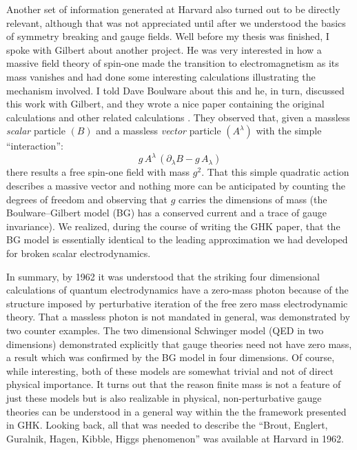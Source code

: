 \documentclass[12pt]{article}
\newcommand{\pa}{\partial}
\begin{document}
Another set of information generated at Harvard also turned out to be
directly relevant, although that was not appreciated until after we
understood the basics of symmetry breaking and gauge fields. Well
before my thesis was finished, I spoke with Gilbert about another
project. He was very interested in how a massive field theory of
spin-one made the transition to electromagnetism as its mass vanishes
and had done some interesting calculations illustrating the mechanism
involved. I told Dave Boulware about this and he, in turn, discussed
this work with Gilbert, and they wrote a nice paper containing the
original calculations and other related calculations \cite{bg;1962}.
They observed that, given a massless \emph{scalar} particle $(B)$ and
a massless \emph{vector} particle $(A^{\lambda})$ with the simple
``interaction'':
\begin{equation*} g\, A^{\lambda}\,
\left(\pa_{\lambda}B - g\,A_{\lambda}\right) \end{equation*} there
results a free spin-one field with mass {$g^2$}. That this simple
quadratic action describes a massive vector and nothing more can be
anticipated by counting the degrees of freedom and observing that $g$
carries the dimensions of mass (the Boulware--Gilbert model (BG) has
a conserved current and a trace of gauge invariance). We realized,
during the course of writing the GHK paper, that the BG model is
essentially identical to the leading approximation we had developed
for broken scalar electrodynamics.

 In summary, by 1962 it was understood that the striking four
 dimensional calculations of quantum electrodynamics have a zero-mass
 photon because of the structure imposed by perturbative iteration of
 the free zero mass electrodynamic theory. That a massless photon is
 not mandated in general, was demonstrated by two counter
 examples. The two dimensional Schwinger model \cite{sch2;1962} (QED
 in two dimensions) demonstrated explicitly that gauge theories need
 not have zero mass, a result which was confirmed by the BG model in
 four dimensions.  Of course, while interesting, both of these models
 are somewhat trivial and not of direct physical importance. It turns
 out that the reason finite mass is not a feature of just these models
 but is also realizable in physical, non-perturbative gauge theories
 can be understood in a general way within the the framework presented
 in GHK.  Looking back, all that was needed to describe the
 ``Brout, Englert, Guralnik, Hagen, Kibble, Higgs phenomenon'' was
 available at Harvard in 1962.
\end{document}
